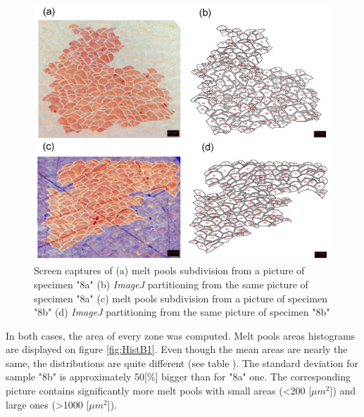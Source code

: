 \begin{figure}[ht]
\centering
\centerline{\includegraphics[scale=0.12]{Images/B1}}
\decoRule
\caption[Screen captures of (a) melt pools subdivision from a picture of specimen "8a" (b) \textit{ImageJ} partitioning from the same picture of specimen "8a" (c) melt pools subdivision from a picture of specimen "8b" (d) \textit{ImageJ} partitioning from the same picture of specimen "8b"]{Screen captures of (a) melt pools subdivision from a picture of specimen "8a" (b) \textit{ImageJ} partitioning from the same picture of specimen "8a" (c) melt pools subdivision from a picture of specimen "8b" (d) \textit{ImageJ} partitioning from the same picture of specimen "8b"}
\label{fig:B1}
\end{figure} 

In both cases, the area of every zone was computed. Melt pools areas histograms are displayed on figure \ref{fig:HistB1}. Even though the mean areas are nearly the same, the distributions are quite different (see table ). The standard deviation for sample "8b" is approximately 50[\%] bigger than for "8a" one. The corresponding picture contains significantly more melt pools with small areas (<200 [$\mu m^2$]) and large ones (>1000 [$\mu m^2$]). \\

